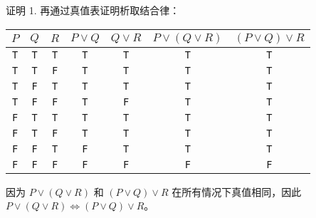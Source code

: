 \begin{proofs}{证明 1. }
    再通过真值表证明析取结合律：
    \begin{center}
        \begin{tabular}{c|c|c|c|c|c|c}
              $P$    & $Q$   & $R$ & $P \lor Q$ &  $Q \lor R$  & $P \lor (Q \lor R)$ & $(P \lor Q) \lor R$ \\
              \hline
              \verb|T| & \verb|T| & \verb|T| &  \verb|T|  &    \verb|T|    &\verb|T| &    \verb|T|    \\
              \verb|T| & \verb|T| & \verb|F| &  \verb|T|  &    \verb|T|    &\verb|T| &    \verb|T|    \\
              \verb|T| & \verb|F| & \verb|T| &  \verb|T|  &    \verb|T|    &\verb|T| &    \verb|T|    \\
              \verb|T| & \verb|F| & \verb|F| &  \verb|T|  &    \verb|F|    &\verb|T| &    \verb|T|    \\
              \verb|F| & \verb|T| & \verb|T| &  \verb|T|  &    \verb|T|    &\verb|T| &    \verb|T|    \\
              \verb|F| & \verb|T| & \verb|F| &  \verb|T|  &    \verb|T|    &\verb|T| &    \verb|T|    \\
              \verb|F| & \verb|F| & \verb|T| &  \verb|F|  &    \verb|T|    &\verb|T| &    \verb|T|    \\
              \verb|F| & \verb|F| & \verb|F| &  \verb|F|  &    \verb|F|    &\verb|F| &    \verb|F|    \\
        \end{tabular}
    \end{center}

    因为 $P \lor (Q \lor R)$ 和 $(P \lor Q) \lor R$ 在所有情况下真值相同，因此 $P \lor (Q \lor R) \iff (P \lor Q) \lor R$。
\end{proofs}

